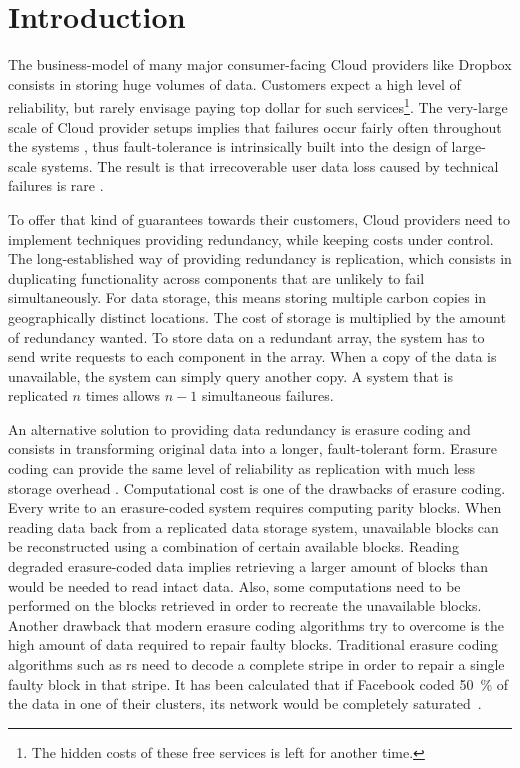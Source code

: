 \section{Introduction}
\label{sec:intro}

The business-model of many major consumer-facing Cloud providers like Dropbox consists in storing huge volumes of data. Customers expect a high level of reliability, but rarely envisage paying top dollar for such services\footnote{The hidden costs of these free services is left for another time.}. The very-large scale of Cloud provider setups implies that failures occur fairly often throughout the systems \autocite{failures-study}, thus fault-tolerance is intrinsically built into the design of large-scale systems. The result is that irrecoverable user data loss caused by technical failures is rare \autocite{racs}.


To offer that kind of guarantees towards their customers, Cloud providers need to implement techniques providing redundancy, while keeping costs under control. The long-established way of providing redundancy is replication, which consists in duplicating functionality across components that are unlikely to fail simultaneously. For data storage, this means storing multiple carbon copies in geographically distinct locations. The cost of storage is multiplied by the amount of redundancy wanted. To store data on a redundant array, the system has to send write requests to each component in the array. When a copy of the data is unavailable, the system can simply query another copy. A system that is replicated $n$ times allows $n-1$ simultaneous failures.

An alternative solution to providing data redundancy is erasure coding and consists in transforming original data into a longer, fault-tolerant form. Erasure coding can provide the same level of reliability as replication with much less storage overhead \autocite{Weatherspoon2002}.
Computational cost is one of the drawbacks of erasure coding.
Every write to an erasure-coded system requires computing parity blocks.
When reading data back from a replicated data storage system, unavailable blocks can be reconstructed using a combination of certain available blocks.
Reading degraded erasure-coded data implies retrieving a larger amount of blocks than would be needed to read intact data. Also, some computations need to be performed on the blocks retrieved in order to recreate the unavailable blocks.
Another drawback that modern erasure coding algorithms try to overcome is the high amount of data required to repair faulty blocks.
Traditional erasure coding algorithms such as \ac{rs} need to decode a complete stripe in order to repair a single faulty block in that stripe.
It has been calculated that if Facebook coded \SI{50}{\percent} of the data in one of their clusters, its network would be completely saturated~\autocite{XorbasVLDB}.


